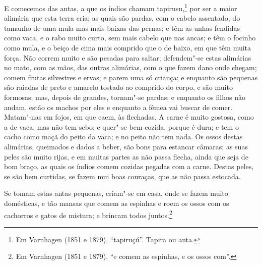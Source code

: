 E comecemos das antas, a que os índios chamam tapirusu,\footnote{ Em Varnhagen (1851 e
1879), ``tapiruçú''. Tapira ou anta.} por ser a maior alimária que esta terra cria; as
quais são pardas, com o cabelo assentado, do tamanho de uma mula mas mais baixas das
pernas; e têm as unhas fendidas como vaca, e o rabo muito curto, sem mais cabelo que nas
ancas; e têm o focinho como mula, e o beiço de cima mais comprido que o de baixo, em que
têm muita força. Não correm muito e são pesadas para saltar; defendem"-se estas alimárias
no mato, com as mãos, das outras alimárias, com o que fazem dano onde chegam; comem frutas
silvestres e ervas; e parem uma só criança; e enquanto são pequenas são raiadas de preto e
amarelo tostado ao comprido do corpo, e são muito formosas; mas, depois de grandes,
tornam"-se pardas; e enquanto os filhos não andam, estão os machos por eles e enquanto a
fêmea vai buscar de comer. Matam"-nas em fojos, em que caem, às flechadas. A carne é muito
gostosa, como a de vaca, mas não tem sebo; e quer"-se bem cozida, porque é dura; e tem o
cacho como maçã do peito da vaca; e no peito não tem nada. Os ossos destas alimárias,
queimados e dados a beber, são bons para estancar câmaras; as suas peles são muito rijas,
e em muitas partes as não passa flecha, ainda que seja de bom braço, as quais os índios
comem cozidas pegadas com a carne. Destas peles, se são bem curtidas, se fazem mui boas
couraças, que as não passa estocada.

Se tomam estas antas pequenas, criam"-se em casa, onde se fazem muito domésticas, e tão
mansas que comem as espinhas e roem os ossos com os cachorros e gatos de mistura; e
brincam todos juntos.\footnote{ Em Varnhagen (1851 e 1879), ``e comem as espinhas, e os
ossos com''.}

